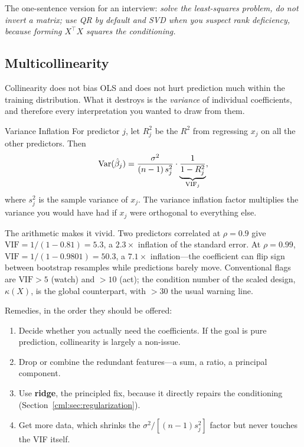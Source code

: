 The one-sentence version for an interview: \textit{solve the least-squares problem, do not invert a matrix; use QR by default and SVD when you suspect rank deficiency, because forming $X^{\top}X$ squares the conditioning.}

\subsection{Multicollinearity}

Collinearity does not bias OLS and does not hurt prediction much within the training distribution. What it destroys is the \emph{variance} of individual coefficients, and therefore every interpretation you wanted to draw from them.

\begin{mathresult}{Variance Inflation}
For predictor $j$, let $R_j^2$ be the $R^2$ from regressing $x_j$ on all the other predictors. Then
\begin{equation}
\operatorname{Var}(\hat\beta_j) = \frac{\sigma^2}{(n-1)\,s_j^2}\cdot \underbrace{\frac{1}{1 - R_j^2}}_{\text{VIF}_j},
\end{equation}
where $s_j^2$ is the sample variance of $x_j$. The variance inflation factor multiplies the variance you would have had if $x_j$ were orthogonal to everything else.
\end{mathresult}

The arithmetic makes it vivid. Two predictors correlated at $\rho = 0.9$ give $\text{VIF} = 1/(1-0.81) = 5.3$, a $2.3\times$ inflation of the standard error. At $\rho = 0.99$, $\text{VIF} = 1/(1 - 0.9801) = 50.3$, a $7.1\times$ inflation---the coefficient can flip sign between bootstrap resamples while predictions barely move. Conventional flags are $\text{VIF} > 5$ (watch) and $> 10$ (act); the condition number of the scaled design, $\kappa(X)$, is the global counterpart, with $> 30$ the usual warning line.

Remedies, in the order they should be offered:
\begin{enumerate}
    \item Decide whether you actually need the coefficients. If the goal is pure prediction, collinearity is largely a non-issue.
    \item Drop or combine the redundant features---a sum, a ratio, a principal component.
    \item Use \textbf{ridge}, the principled fix, because it directly repairs the conditioning (Section~\ref{cml:sec:regularization}).
    \item Get more data, which shrinks the $\sigma^2/[(n-1)s_j^2]$ factor but never touches the VIF itself.
\end{enumerate}

